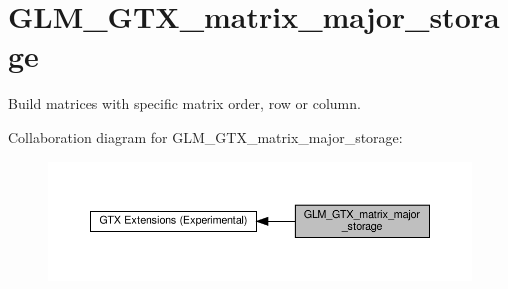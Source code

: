 \hypertarget{group__gtx__matrix__major__storage}{}\section{G\+L\+M\+\_\+\+G\+T\+X\+\_\+matrix\+\_\+major\+\_\+storage}
\label{group__gtx__matrix__major__storage}


Build matrices with specific matrix order, row or column.  


Collaboration diagram for G\+L\+M\+\_\+\+G\+T\+X\+\_\+matrix\+\_\+major\+\_\+storage\+:\nopagebreak
\begin{figure}[H]
\begin{center}
\leavevmode
\includegraphics[width=350pt]{group__gtx__matrix__major__storage}
\end{center}
\end{figure}
